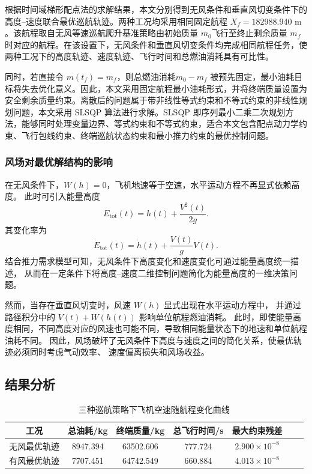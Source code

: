 \documentclass[UTF8]{ctexart}
\begin{document}
根据时间域梯形配点法的求解结果，本文分别得到无风条件和垂直风切变条件下的高度--速度联合最优巡航轨迹。两种工况均采用相同固定航程 $X_f=182988.940\text{ m}$。该航程取自无风等速巡航爬升基准策略由初始质量 $m_0$飞行至终止剩余质量 $m_f$时对应的航程。在该设置下，无风条件和垂直风切变条件均完成相同航程任务，使两种工况下的高度轨迹、速度轨迹、飞行时间和总燃油消耗具有可比性。

同时，若直接令 $m(t_f)=m_f$，则总燃油消耗$m_0-m_f$ 被预先固定，最小油耗目标将失去优化意义。因此，本文采用固定航程最小油耗形式，并将终端质量设置为安全剩余质量约束。离散后的问题属于带非线性等式约束和不等式约束的非线性规划问题，本文采用 SLSQP 算法进行求解。SLSQP 即序列最小二乘二次规划方法，能够同时处理变量边界、等式约束和不等式约束，适合本文包含配点动力学约束、飞行包线约束、终端巡航状态约束和最小推力约束的最优控制问题。

\subsubsection{风场对最优解结构的影响}

在无风条件下，$W(h)=0$，飞机地速等于空速，水平运动方程不再显式依赖高度。
此时可引入能量高度\cite{4}
\begin{equation}
    E_{\mathrm{tot}}(t)
    =
    h(t)+\frac{V^2(t)}{2g}.
    \label{eq:q3_energy_height}
\end{equation}
其变化率为
\begin{equation}
    \dot E_{\mathrm{tot}}(t)
    =
    \dot h(t)+\frac{V(t)}{g}\dot V(t).
    \label{eq:q3_Edot}
\end{equation}
结合推力需求模型可知，无风条件下高度变化和速度变化可通过能量高度统一描述，
从而在一定条件下将高度--速度二维控制问题简化为能量高度的一维决策问题。

然而，当存在垂直风切变时，风速 $W(h)$ 显式出现在水平运动方程中，
并通过路径积分中的 $V(t)+W(h(t))$ 影响单位航程燃油消耗。
此时，即使能量高度相同，不同高度对应的风速也可能不同，导致相同能量状态下的地速和单位航程油耗不同。
因此，风场破坏了无风条件下高度与速度之间的简化关系，使最优轨迹必须同时考虑气动效率、
速度偏离损失和风场收益。
\subsection{结果分析}
\begin{table}[htbp]
\centering
\caption{三种巡航策略下飞机空速随航程变化曲线}
\label{tab:opt_results_wind}
\begin{tabular}{ccccccc}
\toprule
工况 & 总油耗/kg & 终端质量/kg & 总飞行时间/s & 最大约束残差 \\
\midrule
无风最优轨迹 & 8947.394 & 63502.606 & 777.724& $2.900\times10^{-8}$ \\
有风最优轨迹 & 7707.451 & 64742.549 & 660.884& $4.013\times10^{-8}$ \\
\bottomrule
\end{tabular}
\end{table}
\end{document}
